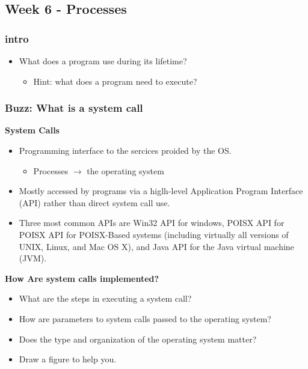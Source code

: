 
\subsection*{Week 6 - Processes}
\subsubsection*{intro}
\begin{itemize}
\item What does a program use during its lifetime?
  \begin{itemize}
  \item Hint: what does a program need to execute?
  \end{itemize}
\end{itemize}

\subsubsection*{Buzz: What is a system call}

\textbf{System Calls}

\begin{itemize}
\item Programming interface to the sercices proided by the OS.
  \begin{itemize}
  \item Processes $\rightarrow$ the operating system
  \end{itemize}
\item Mostly accessed by programs via a higlh-level Application Program Interface (API) rather than direct system call use.
\item Three most common APIs are Win32 API for windows, POISX API for POISX API for POISX-Based systems (including virtually all versions of UNIX, Linux, and Mac OS X), and Java API for the Java virtual machine (JVM).
\end{itemize}

\textbf{How Are system calls implemented?}

\begin{itemize}
\item What are the steps in executing a system call?
\item How are parameters to system calls passed to the operating system?
\item Does the type and organization of the operating system matter?
\item Draw a figure to help you.
\end{itemize}

